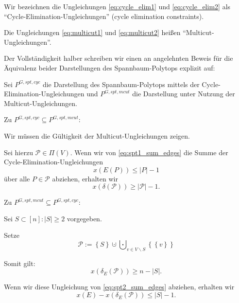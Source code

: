 \documentclass[10p,a4paper,BCOR = 12mm, DIV=15]{scrbook}
\begin{document}
\begin{Bem}
Wir bezeichnen die Ungleichungen \eqref{eq:cycle_elim1} und \eqref{eq:cycle_elim2} als "`Cycle-Elimination-Ungleichungen"' (cycle elimination constraints).

Die Ungleichungen \eqref{eq:multicut1} und \eqref{eq:multicut2} heißen "`Multicut-Ungleichungen"'.
\end{Bem}

Der Vollständigkeit halber schreiben wir einen an \cite{magnanti_wolsey1995} angelehnten Beweis für die Äquivalenz beider Darstellungen des Spannbaum-Polytops explizit auf:

\begin{bew}
Sei $P^{G, spt, cyc}$ die Darstellung des Spannbaum-Polytops mittels der Cycle-Elimination-Ungleichungen und $P^{G, spt, mcut}$ die Darstellung unter Nutzung der Multi\-cut-Ungleichungen.

Zu $P^{G, spt, cyc} \subseteq P^{G, spt, mcut}$:

Wir müssen die Gültigkeit der Multicut-Ungleichungen zeigen.

Sei hierzu $\mathcal{P} \in \Pi\left(V\right)$. Wenn wir von \eqref{eq:spt1_sum_edges} die Summe der Cycle-Elimination-Ungleichungen
\begin{displaymath}
x\left(E\left(P\right)\right) \leq \left|P\right|-1
\end{displaymath}
über alle $P \in \mathcal{P}$ abziehen, erhalten wir
\begin{displaymath}
x\left(\delta\left(\mathcal{P}\right)\right) \geq \left|\mathcal{P}\right|-1.
\end{displaymath}

Zu $P^{G, spt, mcut} \subseteq P^{G, spt, cyc}$:

Sei $S \subset \left[n\right]: \left|S\right| \geq 2$ vorgegeben.

Setze
\begin{displaymath}
\mathcal{P} := \left\{S\right\} \cupdot \bigcupdot_{v \in V \backslash S} \left\{\left\{v\right\}\right\}
\end{displaymath}

Somit gilt:
\begin{displaymath}
x\left(\delta_E\left(\mathcal{P}\right)\right) \geq n-\left|S\right|.
\end{displaymath}

Wenn wir diese Ungleichung von \eqref{eq:spt2_sum_edges} abziehen, erhalten wir
\begin{equation}
x\left(E\right) - x\left(\delta_E\left(\mathcal{P}\right)\right) \leq \left|S\right| - 1. \label{eq:pre_mcut}
\end{equation}


\end{bew}
\end{document}
